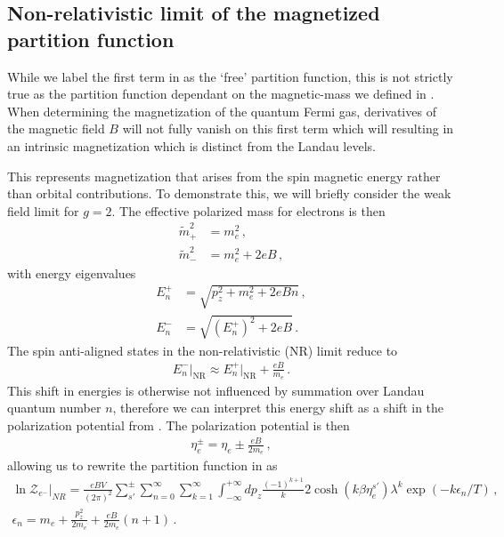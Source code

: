 \subsection{Non-relativistic limit of the magnetized partition function}
\label{sec:nrboltz}
While we label the first term in  as the `free' partition function, this is not strictly true as the partition function dependant on the magnetic-mass we defined in . When determining the magnetization of the quantum Fermi gas, derivatives of the magnetic field $B$ will not fully vanish on this first term which will resulting in an intrinsic magnetization which is distinct from the Landau levels.

This represents magnetization that arises from the spin magnetic energy rather than orbital contributions. To demonstrate this, we will briefly consider the weak field limit for $g=2$. The effective polarized mass for electrons is then
\begin{align}
  \label{MagMassPlus}
  \tilde{m}_{+}^{2}&=m_{e}^{2}\,,\\
  \label{MagMassMinus}
  \tilde{m}_{-}^{2}&=m_{e}^{2}+2eB\,,
\end{align}
with energy eigenvalues
\begin{align}
  \label{EPlus}
  E_{n}^{+}&=\sqrt{p_{z}^{2}+m_{e}^{2}+2eBn}\,,\\
  \label{EMinus}
  E_{n}^{-}&=\sqrt{\left(E_{n}^{+}\right)^{2}+2eB}\,.
\end{align}
The spin anti-aligned states in the non-relativistic (NR) limit reduce to
\begin{align}
  \label{EMinusNR} E_{n}^{-}\vert_\mathrm{NR}\approx E_{n}^{+}\vert_\mathrm{NR}+\frac{eB}{m_{e}}\,.
\end{align}
This shift in energies is otherwise not influenced by summation over Landau quantum number $n$, therefore we can interpret this energy shift as a shift in the polarization potential from . The polarization potential is then
\begin{align}
  \label{SpinChem} \eta_{e}^{\pm}=\eta_{e}\pm\frac{eB}{2m_{e}}\,,
\end{align}
allowing us to rewrite the partition function in  as
\begin{gather}
  \label{PartTotalNR} \ln\mathcal{Z}_{e^{-}}\vert_{NR}=\frac{eBV}{(2\pi)^{2}}\sum_{s'}^{\pm}\sum_{n=0}^{\infty}\sum_{k=1}^{\infty}\int_{-\infty}^{+\infty}dp_{z}\frac{(-1)^{k+1}}{k}2\cosh(k\beta\eta_{e}^{s'})\lambda^{k}\exp(-k\epsilon_{n}/T)\,,\\
  \label{NREnergy} \epsilon_{n}=m_{e}+\frac{p_{z}^{2}}{2m_{e}}+\frac{eB}{2m_{e}}\left(n+1\right)\,.
\end{gather}


